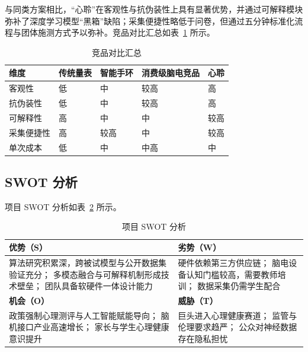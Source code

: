 \documentclass[zihao=-4,fontset=windows,a4paper]{ctexart}
\begin{document}
与同类方案相比，“心聆”在客观性与抗伪装性上具有显著优势，并通过可解释模块弥补了深度学习模型“黑箱”缺陷；采集便捷性略低于问卷，但通过五分钟标准化流程与团体施测方式予以弥补。竞品对比汇总如表~\ref{tab:comp} 所示。

\begin{table}[H]
\centering
\caption{竞品对比汇总}
\label{tab:comp}
\setlength{\tabcolsep}{4pt}
\begin{tabular}{p{2.7cm}p{3.1cm}p{3.1cm}p{3.1cm}p{2.2cm}}
\toprule
\textbf{维度} & \textbf{传统量表} & \textbf{智能手环} & \textbf{消费级脑电竞品} & \textbf{心聆} \\
\midrule
客观性 & 低 & 中 & 较高 & 高 \\
抗伪装性 & 低 & 中 & 较高 & 高 \\
可解释性 & 高 & 中 & 中 & 较高 \\
采集便捷性 & 高 & 较高 & 中 & 较高 \\
单次成本 & 低 & 中 & 中高 & 中 \\
\bottomrule
\end{tabular}
\end{table}

\subsection{SWOT 分析}

项目 SWOT 分析如表~\ref{tab:swot} 所示。

\begin{table}[H]
\centering
\caption{项目 SWOT 分析}
\label{tab:swot}
\begin{tabular}{p{7.3cm}p{7.3cm}}
\toprule
\textbf{优势（S）} & \textbf{劣势（W）} \\
\midrule
算法研究积累深，跨被试模型与公开数据集验证充分；
多模态融合与可解释机制形成技术壁垒；
团队具备软硬件一体设计能力 & 硬件依赖第三方供应链；
脑电设备认知门槛较高，需要教师培训；
数据采集仍需学生配合 \\
\midrule
\textbf{机会（O）} & \textbf{威胁（T）} \\
政策强制心理测评与人工智能赋能导向；
脑机接口产业高速增长；
家长与学生心理健康意识提升 & 巨头进入心理健康赛道；
监管与伦理要求趋严；
公众对神经数据存在隐私担忧 \\
\bottomrule
\end{tabular}
\end{table}

\end{document}
